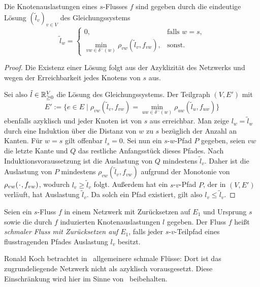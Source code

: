 \begin{proposition}\label{prop-congestion-labels-dijkstra}
	Die Knotenauslastungen eines $s$-Flusses $f$ sind gegeben durch die eindeutige Lösung $(\tilde{l}_v)_{v\in V}$ des Gleichungssystems
	\[
	\tilde{l}_w = \begin{cases}
		0, & \text{falls $w=s$,}\\
		\min_{vw\in \delta^-(w)} \rho_{vw}(\tilde{l}_v, f_{vw}), & \text{sonst.}
	\end{cases}
	\]
\end{proposition}
\begin{proof}
	Die Existenz einer Lösung folgt aus der Azyklizität des Netzwerks und wegen der Erreichbarkeit jedes Knotens von $s$ aus.
	
	Sei also $\tilde{l}\in\mathbb{R}_{\geq 0}^V$ die Lösung des Gleichungssystems.
	Der Teilgraph $(V, E')$ mit \[
	E':= \{ e\in E \mid \rho_{vw}(\tilde{l}_v, f_{vw}) = \min_{uw\in\delta^-(w)}  \rho_{uw}(\tilde{l}_u, f_{uw}) \}
	\]
	ebenfalls azyklisch und jeder Knoten ist von $s$ aus erreichbar.
	Man zeige $l_w = \tilde{l}_w$ durch eine Induktion über die Distanz von $w$ zu $s$ bezüglich der Anzahl an Kanten.
	Für $w=s$ gilt offenbar $l_s = 0$.
	Sei nun ein $s$-$w$-Pfad $P$ gegeben, seien $vw$ die letzte Kante und $Q$ das restliche Anfangsstück dieses Pfades.
	Nach Induktionsvoraussetzung ist die Auslastung von $Q$ mindestens $\tilde{l}_v$.
	Daher ist die Auslastung von $P$ mindestens $\rho_{vw}(\tilde{l}_v, f_{vw})$ aufgrund der Monotonie von $\rho_{vw}(\PlH, f_{vw})$, wodurch $l_v \geq \tilde{l}_v$ folgt.
	Außerdem hat ein $s$-$v$-Pfad $P$, der in $(V, E')$ verläuft, hat Auslastung $\tilde{l}_v$.
	Da solch ein Pfad existiert, gilt also $l_v \leq \tilde{l}_v$.
\end{proof}

\begin{definition}
	Seien ein $s$-Fluss $f$ in einem Netzwerk mit Zurücksetzen auf $E_1$ und Ursprung $s$ sowie die durch $f$ induzierten Knotenauslastungen $l$ gegeben.
	Der Fluss $f$ heißt \emph{schmaler Fluss mit Zurücksetzen auf $E_1$}, falls jeder $s$-$v$-Teilpfad eines flusstragenden Pfades Auslastung $l_v$ besitzt. 
\end{definition}
\begin{remark}
	Ronald Koch betrachtet in~\cite{Koch2012} allgemeinere schmale Flüsse: Dort ist das zugrundeliegende Netzwerk nicht als azyklisch vorausgesetzt.
	Diese Einschränkung wird hier im Sinne von~\cite{Cominetti2015} beibehalten.
\end{remark}

